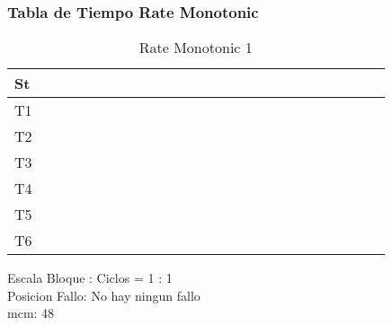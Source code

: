 \documentclass[xcolor=table]{beamer}
\begin{document}
\begin{frame} 
\frametitle{Tabla de Tiempo  Rate Monotonic } 
\begin{table} 
\centering 
\begin{tabular}{|l|l|l|l|l|l|l|l|l|l|l|l|l|l|l|l|l|l|l|l|l|l|l|l|l|} 
\hline 
St & \cellcolor{green} & \cellcolor{green} & \cellcolor{green} & \cellcolor{green} & \cellcolor{green} & \cellcolor{green} & \cellcolor{green} & \cellcolor{green} & \cellcolor{green} & \cellcolor{green} & \cellcolor{green} & \cellcolor{green} & \cellcolor{green} & \cellcolor{green} & \cellcolor{green} & \cellcolor{green} & \cellcolor{green} & \cellcolor{green} & \cellcolor{green} & \cellcolor{green} & \cellcolor{green} & \cellcolor{green} & \cellcolor{green} & \cellcolor{green} \\ \hline 
T1 & \cellcolor{blue} & & & & & & & & & & & & & & & & & & & & & & & \\ \hline 
T2 & & \cellcolor{purple} & & & & & & & & & & & & & & & & & & & & & & \\ \hline 
T3 & & & \cellcolor{cyan} & & & & & & & & & & & & & & & & & & & & & \\ \hline 
T4 & & & & \cellcolor{gray} & & & & & & & & & & & & & & & & & & & & \\ \hline 
T5 & & & & & \cellcolor{yellow} & & & & & & & & & & & & & & & & & & & \\ \hline 
T6 & & & & & & \cellcolor{orange} & & & & & & & & & & & & & & & & & & \\ \hline 
\end{tabular} 
\caption{ Rate Monotonic 1 } 
\end{table} 
Escala Bloque : Ciclos = 1 : 1 \\ 
Posicion Fallo: No hay ningun fallo \\ 
mcm:  48 \\ 
\end{frame} 

\end{document}
